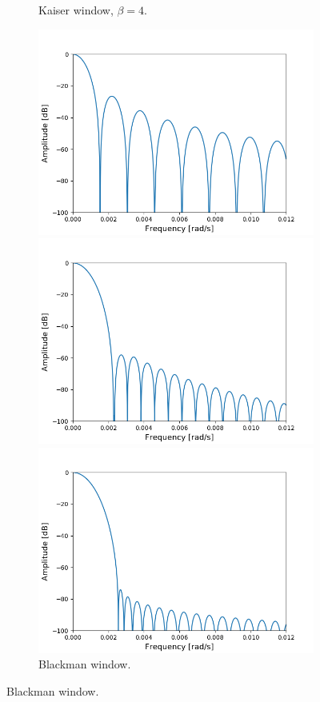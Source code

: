 \begin{figure}[H]
\begin{subfigure}{0.49\textwidth}
\caption{Kaiser window, $\beta=4$.}
\end{subfigure}
\centering
\begin{subfigure}{0.49\textwidth}
\centering
\includegraphics[width=\textwidth]{figures/dbplots/stft_bilag/8192/bartlett.png}
\caption{Bartlett window.}
\includegraphics[width=\textwidth]{figures/dbplots/stft_bilag/8192/blackman.png}
\caption{Blackman window.}
\includegraphics[width=\textwidth]{figures/dbplots/stft_bilag/8192/kaiser10.png}

\end{subfigure}
\end{figure}
